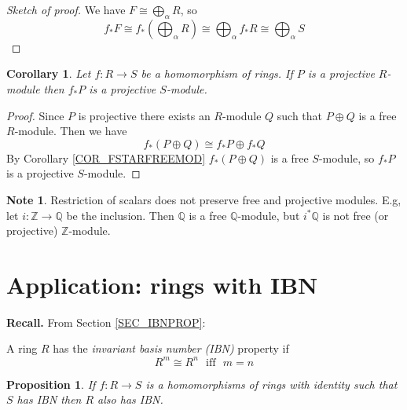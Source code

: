 \documentclass[12pt, letterpaper, oneside]{article}
\theoremstyle{plain}
\newtheorem{proposition}[theorem]{Proposition}
\newtheorem{corollary}[theorem]{Corollary}
\theoremstyle{definition}
\newtheorem{note}[theorem]{Note}
\newcommand{\Z}{{\mathbb Z}}
\newcommand{\Q}{{\mathbb Q}}
\newcommand{\vs}{\vskip 5mm}
\begin{document}
\vs

\begin{proof}[Sketch of proof]
We have $F\cong \bigoplus_{\alpha} R$, so 
$$f_{\ast}F\cong f_{\ast}(\bigoplus_{\alpha} R) \cong \bigoplus_{\alpha} 
f_{\ast}R \cong \bigoplus_{\alpha} S$$
\end{proof}

\vs\vs

\begin{corollary}
Let $f\colon R\to S$ be a homomorphism of rings. If $P$ is a projective $R$-module 
then $f_{\ast}P$ is a projective $S$-module. 
\end{corollary}


\vs

\begin{proof}
Since $P$ is projective there exists an $R$-module $Q$ such that $P\oplus Q$ is a 
free $R$-module. Then we have 
$$f_{\ast}(P\oplus Q) \cong f_{\ast}P \oplus f_{\ast}Q$$
By Corollary \ref{COR_FSTARFREEMOD} $f_{\ast}(P\oplus Q)$ is a free $S$-module, 
so $f_{\ast}P$ is a projective $S$-module. 
\end{proof}


\vs\vs

\begin{note}
Restriction of scalars does not preserve free and projective modules. E.g, let
$i\colon \Z \to \Q$  be the inclusion.  Then $\Q$ is a free $\Q$-module, but 
$i^{\ast}\Q$ is not free (or projective) $\Z$-module.
\end{note}







\newpage
\section{Application: rings with IBN}
\label{SEC_APPRINGSWITHIBN}

\textbf{Recall.} From Section \ref{SEC_IBNPROP}: 

A ring $R$ has the \emph{invariant basis number (IBN)} property if 
$$R^{m}\cong R^{n} \ \ \ \text{iff} \ \ \ m=n$$

\vs\vs

\begin{proposition}
\label{PROP_IBNMAPPRES}
If $f\colon R \to S$ is a homomorphisms of rings with identity such that $S$
has IBN then $R$ also has IBN. 
\end{proposition}
\end{document}
